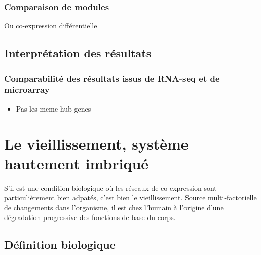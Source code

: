 \subsubsection{Comparaison de modules}

Ou co-expression différentielle

\subsection{Interprétation des résultats}

\subsubsection{Comparabilité des résultats issus de RNA-seq et de microarray}
\begin{itemize}
    \item Pas les meme hub genes %
\end{itemize}




\section{Le vieillissement, système hautement imbriqué}
S'il est une condition biologique où les réseaux de co-expression sont particulièrement bien adpatés, c'est bien le vieillissement. Source multi-factorielle de changements dans l'organisme, il est chez l'humain à l'origine d'une dégradation progressive des fonctions de base du corps.



\subsection{Définition biologique}

